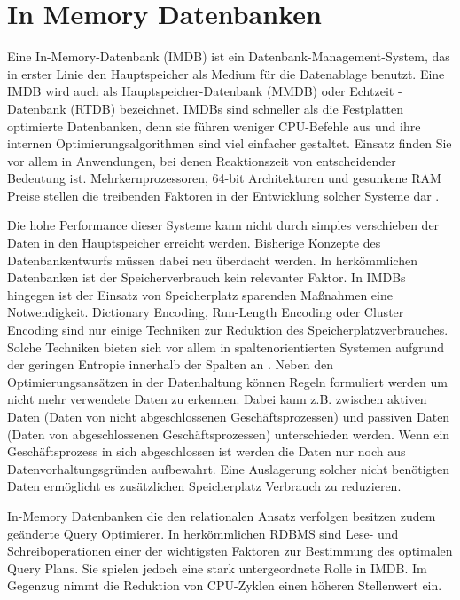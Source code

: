 \section{In Memory Datenbanken}
\label{ch:grundlagen:sec:InMemoryDatenbanken}

Eine In-Memory-Datenbank (IMDB) ist ein Datenbank-Management-System, das in erster Linie den Hauptspeicher als Medium für die Datenablage benutzt. Eine IMDB wird auch als Hauptspeicher-Datenbank (MMDB) oder Echtzeit -Datenbank (RTDB) bezeichnet. IMDBs sind schneller als die Festplatten optimierte Datenbanken, denn sie führen weniger CPU-Befehle aus und ihre internen Optimierungsalgorithmen sind viel einfacher gestaltet. Einsatz finden Sie vor allem in Anwendungen, bei denen Reaktionszeit von entscheidender Bedeutung ist. Mehrkernprozessoren, 64-bit Architekturen und gesunkene RAM Preise stellen die treibenden Faktoren in der Entwicklung solcher Systeme dar \cite{SWB-381840476}.

Die hohe Performance dieser Systeme kann nicht durch simples verschieben der Daten in den Hauptspeicher erreicht werden. Bisherige Konzepte des Datenbankentwurfs müssen dabei neu überdacht werden. In herkömmlichen Datenbanken ist der Speicherverbrauch kein relevanter Faktor. In IMDBs hingegen ist der Einsatz von Speicherplatz sparenden Maßnahmen eine Notwendigkeit. Dictionary Encoding, Run-Length Encoding oder Cluster Encoding sind nur einige Techniken zur Reduktion des Speicherplatzverbrauches. Solche Techniken bieten sich vor allem in spaltenorientierten Systemen aufgrund der geringen Entropie innerhalb der Spalten an \cite{Abadi:2006:ICE:1142473.1142548}. Neben den Optimierungsansätzen in der Datenhaltung können Regeln formuliert werden um nicht mehr verwendete Daten zu erkennen. Dabei kann z.B. zwischen aktiven Daten (Daten von nicht abgeschlossenen Geschäftsprozessen) und passiven Daten (Daten von abgeschlossenen Geschäftsprozessen) unterschieden werden. Wenn ein Geschäftsprozess in sich abgeschlossen ist werden die Daten nur noch aus Datenvorhaltungsgründen aufbewahrt. Eine Auslagerung solcher nicht benötigten Daten ermöglicht es zusätzlichen Speicherplatz Verbrauch zu reduzieren.
 
In-Memory Datenbanken die den relationalen Ansatz verfolgen besitzen zudem geänderte Query Optimierer. In herkömmlichen RDBMS sind Lese- und Schreiboperationen einer der wichtigsten Faktoren zur Bestimmung des optimalen Query Plans. Sie spielen jedoch eine stark untergeordnete Rolle in IMDB. Im Gegenzug nimmt die Reduktion von CPU-Zyklen einen höheren Stellenwert ein.

